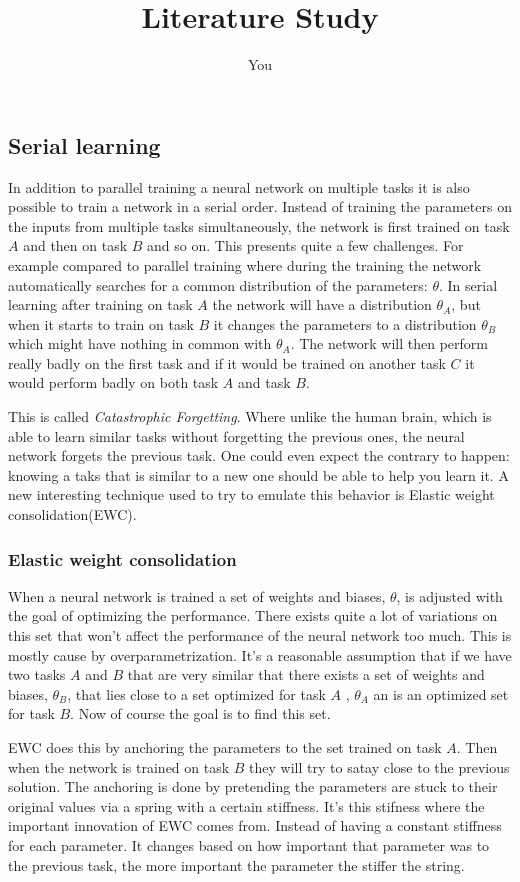 \documentclass[a4paper]{article}
\title{Literature Study}
\author{You}
\begin{document}
\subsection{Serial learning}
In addition to parallel training a neural network on multiple tasks it is also possible to train a network in a serial order. Instead of training the parameters on the inputs from multiple tasks simultaneously, the network is first trained on task $A$ and then on task $B$ and so on. This presents quite a few challenges. For example compared to parallel training where during the training the network automatically searches for a common distribution of the parameters: $\theta$. In serial learning after training on task $A$ the network will have a distribution $\theta_{A}$, but when it starts to train on task $B$ it changes the parameters to a distribution $\theta_{B}$ which might have nothing in common with $\theta_{A}$. The network will then perform really badly on the first task and if it would be trained on another task $C$ it would perform badly on both task $A$ and task $B$.

This is called \emph{Catastrophic Forgetting}. Where unlike the human brain, which is able to learn similar tasks without forgetting the previous ones, the neural network forgets the previous task. One could even expect the contrary to happen: knowing a taks that is similar to a new one should be able to help you learn it. A new interesting technique used to try to emulate this behavior is Elastic weight consolidation(EWC)\cite{EWC}.

\subsubsection{Elastic weight consolidation}
When a neural network is trained a set of weights and biases, $\theta$, is adjusted with the goal of optimizing the performance. There exists quite a lot of variations on this set that won't affect the performance of the neural network too much. This is mostly cause by overparametrization. It's a reasonable assumption that if we have two tasks $A$ and $B$ that are very similar that there exists a set of weights and biases, $\theta_B$, that lies close to a set optimized for task $A$ , $\theta_A$ an is an optimized set for task $B$. Now of course the goal is to find this set.

EWC does this by anchoring the parameters to the set trained on task $A$. Then when the network is trained on task $B$ they will try to satay close to the previous solution. The anchoring is done by pretending the parameters are stuck to their original values via a spring with a certain stiffness. It's this stifness where the important innovation of EWC comes from. Instead of having a constant stiffness for each parameter. It changes based on how important that parameter was to the previous task, the more important the parameter the stiffer the string. 
\end{document}
